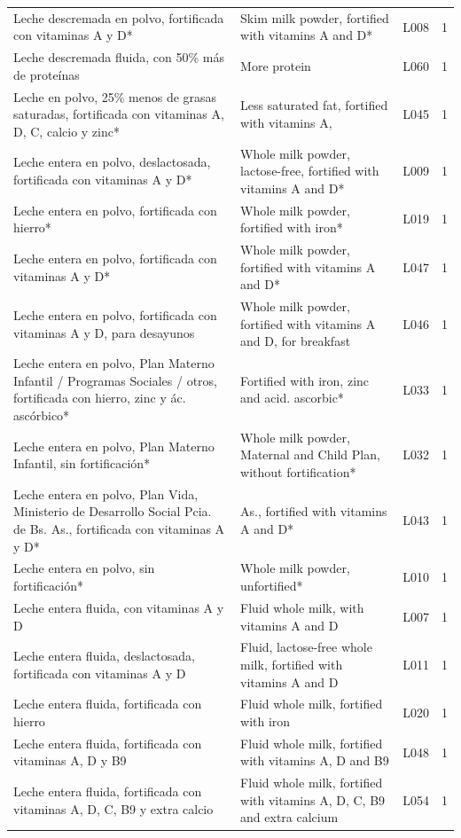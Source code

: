 {\begin{longtable}{p{4.3cm}p{5.5cm}p{1.5cm}p{0.7cm}}
Leche descremada en polvo, fortificada con vitaminas A y D* & Skim milk powder, fortified with vitamins A and D* & L008 & 1\\
Leche descremada fluida, con 50\% más de proteínas & More protein & L060 & 1\\
Leche en polvo, 25\% menos de grasas saturadas, fortificada con vitaminas A, D, C, calcio y zinc* & Less saturated fat, fortified with vitamins A, & L045 & 1\\
Leche entera en polvo, deslactosada, fortificada con vitaminas A y D* & Whole milk powder, lactose-free, fortified with vitamins A and D* & L009 & 1\\
Leche entera en polvo, fortificada con hierro* & Whole milk powder, fortified with iron* & L019 & 1\\
Leche entera en polvo, fortificada con vitaminas A y D* & Whole milk powder, fortified with vitamins A and D* & L047 & 1\\
Leche entera en polvo, fortificada con vitaminas A y D, para desayunos & Whole milk powder, fortified with vitamins A and D, for breakfast & L046 & 1\\
Leche entera en polvo, Plan Materno Infantil / Programas Sociales / otros, fortificada con hierro, zinc y ác. ascórbico* & Fortified with iron, zinc and acid. ascorbic* & L033 & 1\\
Leche entera en polvo, Plan Materno Infantil, sin fortificación* & Whole milk powder, Maternal and Child Plan, without fortification* & L032 & 1\\
Leche entera en polvo, Plan Vida, Ministerio de Desarrollo Social Pcia. de Bs. As., fortificada con vitaminas A y D* & As., fortified with vitamins A and D* & L043 & 1\\
Leche entera en polvo, sin fortificación* & Whole milk powder, unfortified* & L010 & 1\\
Leche entera fluida, con vitaminas A y D & Fluid whole milk, with vitamins A and D & L007 & 1\\
Leche entera fluida, deslactosada, fortificada con vitaminas A y D & Fluid, lactose-free whole milk, fortified with vitamins A and D & L011 & 1\\
Leche entera fluida, fortificada con hierro & Fluid whole milk, fortified with iron & L020 & 1\\
Leche entera fluida, fortificada con vitaminas A, D y B9 & Fluid whole milk, fortified with vitamins A, D and B9 & L048 & 1\\
Leche entera fluida, fortificada con vitaminas A, D, C, B9 y extra calcio & Fluid whole milk, fortified with vitamins A, D, C, B9 and extra calcium & L054 & 1\\

\end{longtable}}
